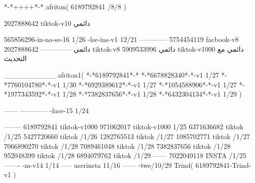 *-*++++*-*
afriton(
6189792841 /8/8
)

2027888642 tiktok-v10
دائمي

565856296-in-no-se-16 1/26
-lse-ins-v1 12/21
------------
5754454119 facbook-v8
دائمي
--------------
2027888642 tiktok-v8
دائمي
5909533996 tiktok-v1000
دائمي مع التحديث

__________
afriton1(
*-*6189792841*-*
*-*6678828340*-*-v1 1/27
*-*7760104780*-*-v1 1/30
*-*6929389612*-*-v1 1/27
*-*1054588906*-*-v1 1/27
*-*1977343592*-*-v1 1/28
*-*7382837656*-*-v1 1/28
*-*6432304134*-*-v1 1/29
)

------
------------
-face-15 1/24

--------
6189792841 tiktok-v1000
971062017 tiktok-v1000 1/25
6371636682 tiktok /1/25
5427720660 tiktok /1/26
1282765513 tiktok /1/27
1085702771 tiktok /1/27
7066890270 tiktok /1/28
7089461048 tiktok /1/28
7382837656 tiktok /1/28
952048399 tiktok /1/28
6894079762 tiktok /1/29
------
7022049118 INSTA /1/25
-------
-m-v14 1/14
-----
userinsta 11/16
------
-twe/10/29
Trind(
6189792841-Trind-v1 
)
